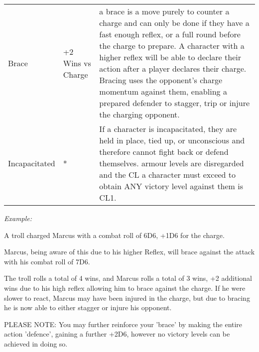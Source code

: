 \begin{center}
\begin{xltabular}{\textwidth}{|l l X|}
        Brace & +2 Wins vs Charge &
            a brace is a move purely to counter a charge and can only be done if they have a fast enough reflex, or a full round before the charge to prepare. A character with a higher reflex will be able to declare their action after a player declares their charge. Bracing uses the opponent’s charge momentum against them, enabling a prepared defender to stagger, trip or injure the charging opponent. \\
        Incapacitated & * & 
            If a character is incapacitated, they are held in place, tied up, or unconscious and therefore cannot fight back or defend themselves. armour levels are disregarded and the CL a character must exceed to obtain ANY victory level against them is CL1. \\
        \hline
    \end{xltabular}
\end{center}

\textit{Example:}

\begin{displayquote}
    A troll charged Marcus with a combat roll of 6D6, +1D6 for the charge.

    Marcus, being aware of this due to his higher Reflex, will brace against the attack with his combat roll of 7D6.

    The troll rolls a total of 4 wins, and Marcus rolls a total of 3 wins, +2 additional wins due to his high reflex allowing him to brace against the charge. If he were slower to react, Marcus may have been injured in the charge, but due to bracing he is now able to either stagger or injure his opponent.

    PLEASE NOTE: You may further reinforce your 'brace' by making the entire action 'defence', gaining a further +2D6, however no victory levels can be achieved in doing so.
\end{displayquote}